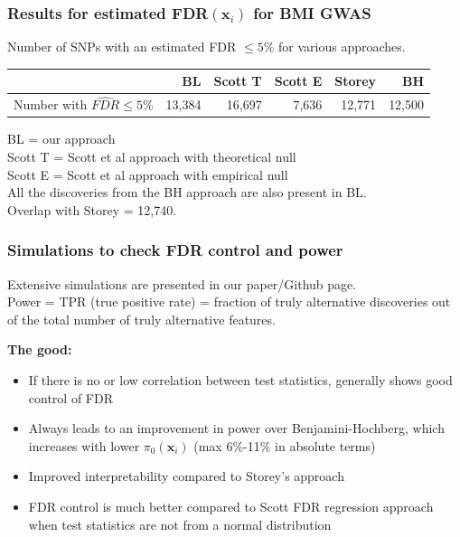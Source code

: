 \documentclass{beamer}
\newcommand{\bx}{\mathbf{x}}
\begin{document}
\begin{frame}
\frametitle{Results for estimated FDR$(\bx_i)$ for BMI GWAS}

Number of  SNPs with an estimated FDR $\le5$\% for various approaches.

\begin{table}[ht]
\begin{tabular}{m{2.2cm}rrrrr}
  \hline
 & BL & Scott T & Scott E & Storey & BH \\ 
  \hline
Number with $\widehat{FDR} \le 5$\%  & 13,384 & 16,697 & 7,636 & 12,771 & 12,500 \\ 
   \hline
\end{tabular}
\end{table}

\vspace{0.5cm}
BL = our approach \\
Scott T = Scott et al approach with theoretical null \\
Scott E = Scott et al approach with empirical null \\

\vspace{0.5cm}
All the discoveries from the BH approach are also present in BL.\\
Overlap with Storey = 12,740.

\end{frame}


\begin{frame}
\frametitle{Simulations to check FDR control and power}

Extensive simulations are presented in our paper/Github page.\\ \vspace{0.2cm}
Power = TPR (true positive rate) = fraction of truly alternative discoveries out of the total number of truly alternative features. \\
\vspace{0.5cm}

\textbf{The good:}

\begin{itemize}
\item If there is no or low correlation between test statistics, generally shows good control of FDR
\item Always leads to an improvement in power over Benjamini-Hochberg, which increases with lower $\pi_0(\bx_i)$ (max 6\%-11\% in absolute terms)
\item Improved interpretability compared to Storey's approach
\item FDR control is much better compared to Scott FDR regression approach when test statistics are not from a normal distribution
\end{itemize}

\end{frame}
\end{document}
